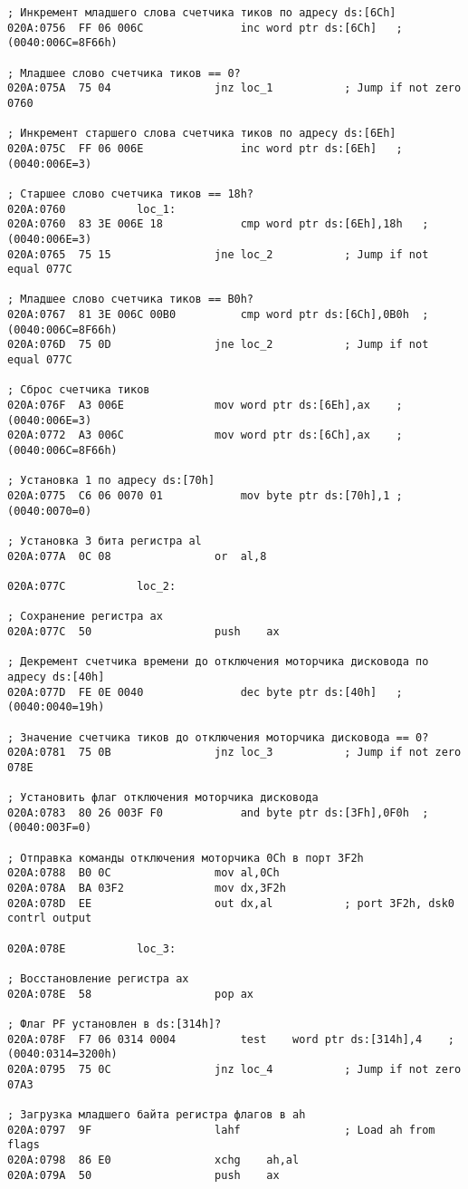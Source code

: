\begin{center}
\begin{lstlisting}[style={asm}, caption = Прерывание int 8h]
; Инкремент младшего слова счетчика тиков по адресу ds:[6Ch]
020A:0756  FF 06 006C				inc	word ptr ds:[6Ch]	; (0040:006C=8F66h)

; Mладшее слово счетчика тиков == 0?
020A:075A  75 04				jnz	loc_1			; Jump if not zero 0760

; Инкремент старшего слова счетчика тиков по адресу ds:[6Eh]
020A:075C  FF 06 006E				inc	word ptr ds:[6Eh]	; (0040:006E=3)

; Старшее слово счетчика тиков == 18h?
020A:0760			loc_1:
020A:0760  83 3E 006E 18			cmp	word ptr ds:[6Eh],18h	; (0040:006E=3)
020A:0765  75 15				jne	loc_2			; Jump if not equal 077C

; Младшее слово счетчика тиков == B0h?
020A:0767  81 3E 006C 00B0			cmp	word ptr ds:[6Ch],0B0h	; (0040:006C=8F66h)
020A:076D  75 0D				jne	loc_2			; Jump if not equal 077C

; Сброс счетчика тиков
020A:076F  A3 006E				mov	word ptr ds:[6Eh],ax	; (0040:006E=3)
020A:0772  A3 006C				mov	word ptr ds:[6Ch],ax	; (0040:006C=8F66h)

; Установка 1 по адресу ds:[70h]
020A:0775  C6 06 0070 01			mov	byte ptr ds:[70h],1	; (0040:0070=0)

; Установка 3 бита регистра al
020A:077A  0C 08				or	al,8

020A:077C			loc_2:

; Сохранение регистра ax
020A:077C  50					push	ax

; Декремент счетчика времени до отключения моторчика дисковода по адресу ds:[40h]
020A:077D  FE 0E 0040				dec	byte ptr ds:[40h]	; (0040:0040=19h)

; Значение счетчика тиков до отключения моторчика дисковода == 0?
020A:0781  75 0B				jnz	loc_3			; Jump if not zero 078E

; Установить флаг отключения моторчика дисковода
020A:0783  80 26 003F F0			and	byte ptr ds:[3Fh],0F0h	; (0040:003F=0)

; Отправка команды отключения моторчика 0Ch в порт 3F2h 
020A:0788  B0 0C				mov	al,0Ch
020A:078A  BA 03F2				mov	dx,3F2h
020A:078D  EE					out	dx,al			; port 3F2h, dsk0 contrl output

020A:078E			loc_3:

; Восстановление регистра ax
020A:078E  58					pop	ax

; Флаг PF установлен в ds:[314h]?
020A:078F  F7 06 0314 0004			test	word ptr ds:[314h],4	; (0040:0314=3200h)
020A:0795  75 0C				jnz	loc_4			; Jump if not zero 07A3

; Загрузка младшего байта регистра флагов в ah
020A:0797  9F					lahf				; Load ah from flags
020A:0798  86 E0				xchg	ah,al
020A:079A  50					push	ax


\end{lstlisting}
\end{center}
